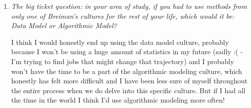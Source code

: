 \documentclass[10pt]{article}
\begin{document}
\begin{enumerate}
    	\item \textit{The big ticket question: in your area of study, if you had to use methods from only one of Breiman's cultures for the rest of your life, which would it be: Data Model or Algorithmic Model?}
	
		I think I would honestly end up using the data model culture, probably because I won't be using a huge amount of statistics in my future (sadly :( - I'm trying to find jobs that might change that trajectory) and I probably won't have the time to be a part of the algorithmic modeling culture, which honestly has felt more difficult and I have been less sure of myself throughout the entire process when we do delve into this specific culture. But if I had all the time in the world I think I'd use algorithmic modeling more often!
    
    \end{enumerate}
\end{document}
